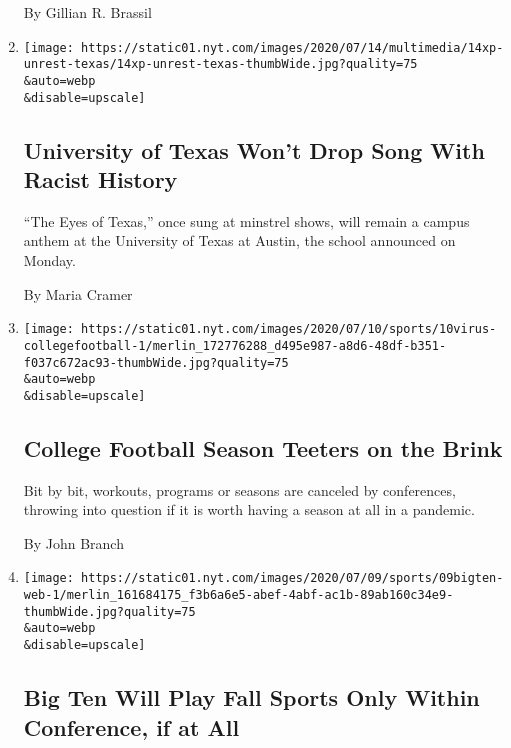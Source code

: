 \begin{enumerate}
  By Gillian R. Brassil
\item
  \href{/2020/07/14/us/eyes-of-texas-football.html}{}

  \texttt{[image: https://static01.nyt.com/images/2020/07/14/multimedia/14xp-unrest-texas/14xp-unrest-texas-thumbWide.jpg?quality=75\\\&auto=webp\\\&disable=upscale]}

  \hypertarget{university-of-texas-wont-drop-song-with-racist-history}{%
  \subsection{University of Texas Won't Drop Song With Racist
  History}\label{university-of-texas-wont-drop-song-with-racist-history}}

  ``The Eyes of Texas,'' once sung at minstrel shows, will remain a
  campus anthem at the University of Texas at Austin, the school
  announced on Monday.

  By Maria Cramer
\item
  \href{/2020/07/10/sports/ncaafootball/coronavirus-college-football-season-canceled.html}{}

  \texttt{[image: https://static01.nyt.com/images/2020/07/10/sports/10virus-collegefootball-1/merlin\_172776288\_d495e987-a8d6-48df-b351-f037c672ac93-thumbWide.jpg?quality=75\\\&auto=webp\\\&disable=upscale]}

  \hypertarget{college-football-season-teeters-on-the-brink}{%
  \subsection{College Football Season Teeters on the
  Brink}\label{college-football-season-teeters-on-the-brink}}

  Bit by bit, workouts, programs or seasons are canceled by conferences,
  throwing into question if it is worth having a season at all in a
  pandemic.

  By John Branch
\item
  \href{/2020/07/09/sports/ncaafootball/big-ten-fall-sports-in-conference.html}{}

  \texttt{[image: https://static01.nyt.com/images/2020/07/09/sports/09bigten-web-1/merlin\_161684175\_f3b6a6e5-abef-4abf-ac1b-89ab160c34e9-thumbWide.jpg?quality=75\\\&auto=webp\\\&disable=upscale]}

  \hypertarget{big-ten-will-play-fall-sports-only-within-conference-if-at-all}{%
  \subsection{Big Ten Will Play Fall Sports Only Within Conference, if
  at
  All}\label{big-ten-will-play-fall-sports-only-within-conference-if-at-all}}


\end{enumerate}

